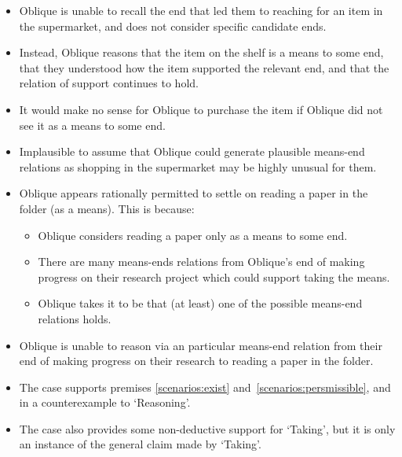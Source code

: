 \documentclass[10pt]{article}
\newcommand{\hozlinedash}[0]{%
  \noindent\hdashrule[0.5ex][c]{\textwidth}{.1pt}{2.5pt}
}
\begin{document}
\begin{itemize}
\item Oblique is unable to recall the end that led them to reaching for an item in the supermarket, and does not consider specific candidate ends.
\item Instead, Oblique reasons that the item on the shelf is a means to some end, that they understood how the item supported the relevant end, and that the relation of support continues to hold.
\item It would make no sense for Oblique to purchase the item if Oblique did not see it as a means to some end.
\item Implausible to assume that Oblique could generate plausible means-end relations as shopping in the supermarket may be highly unusual for them.
\end{itemize}




\hozlinedash

\begin{itemize}
\item Oblique appears rationally permitted to settle on reading a paper in the folder (as a means).
  This is because:
  \begin{itemize}
  \item Oblique considers reading a paper only as a means to some end.
  \item There are many means-ends relations from Oblique's end of making progress on their research project which could support taking the means.
  \item Oblique takes it to be that (at least) one of the possible means-end relations holds.
  \end{itemize}
\item Oblique is unable to reason via an particular means-end relation from their end of making progress on their research to reading a paper in the folder.
\end{itemize}


\begin{itemize}
\item The case supports premises \ref{scenarios:exist} and~\ref{scenarios:persmissible}, and in a counterexample to `Reasoning'.
\item The case also provides some non-deductive support for `Taking', but it is only an instance of the general claim made by `Taking'.
\end{itemize}


\newpage
\end{document}
